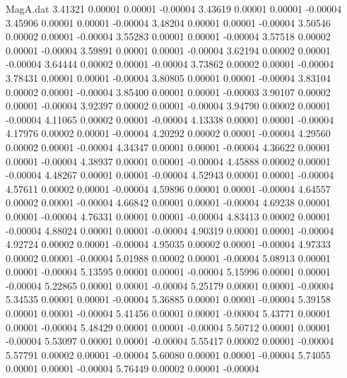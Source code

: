 \begin{filecontents}{MagA.dat}
   3.41321    0.00001    0.00001   -0.00004
   3.43619    0.00001    0.00001   -0.00004
   3.45906    0.00001    0.00001   -0.00004
   3.48204    0.00001    0.00001   -0.00004
   3.50546    0.00002    0.00001   -0.00004
   3.55283    0.00001    0.00001   -0.00004
   3.57518    0.00002    0.00001   -0.00004
   3.59891    0.00001    0.00001   -0.00004
   3.62194    0.00002    0.00001   -0.00004
   3.64444    0.00002    0.00001   -0.00004
   3.73862    0.00002    0.00001   -0.00004
   3.78431    0.00001    0.00001   -0.00004
   3.80805    0.00001    0.00001   -0.00004
   3.83104    0.00002    0.00001   -0.00004
   3.85400    0.00001    0.00001   -0.00003
   3.90107    0.00002    0.00001   -0.00004
   3.92397    0.00002    0.00001   -0.00004
   3.94790    0.00002    0.00001   -0.00004
   4.11065    0.00002    0.00001   -0.00004
   4.13338    0.00001    0.00001   -0.00004
   4.17976    0.00002    0.00001   -0.00004
   4.20292    0.00002    0.00001   -0.00004
   4.29560    0.00002    0.00001   -0.00004
   4.34347    0.00001    0.00001   -0.00004
   4.36622    0.00001    0.00001   -0.00004
   4.38937    0.00001    0.00001   -0.00004
   4.45888    0.00002    0.00001   -0.00004
   4.48267    0.00001    0.00001   -0.00004
   4.52943    0.00001    0.00001   -0.00004
   4.57611    0.00002    0.00001   -0.00004
   4.59896    0.00001    0.00001   -0.00004
   4.64557    0.00002    0.00001   -0.00004
   4.66842    0.00001    0.00001   -0.00004
   4.69238    0.00001    0.00001   -0.00004
   4.76331    0.00001    0.00001   -0.00004
   4.83413    0.00002    0.00001   -0.00004
   4.88024    0.00001    0.00001   -0.00004
   4.90319    0.00001    0.00001   -0.00004
   4.92724    0.00002    0.00001   -0.00004
   4.95035    0.00002    0.00001   -0.00004
   4.97333    0.00002    0.00001   -0.00004
   5.01988    0.00002    0.00001   -0.00004
   5.08913    0.00001    0.00001   -0.00004
   5.13595    0.00001    0.00001   -0.00004
   5.15996    0.00001    0.00001   -0.00004
   5.22865    0.00001    0.00001   -0.00004
   5.25179    0.00001    0.00001   -0.00004
   5.34535    0.00001    0.00001   -0.00004
   5.36885    0.00001    0.00001   -0.00004
   5.39158    0.00001    0.00001   -0.00004
   5.41456    0.00001    0.00001   -0.00004
   5.43771    0.00001    0.00001   -0.00004
   5.48429    0.00001    0.00001   -0.00004
   5.50712    0.00001    0.00001   -0.00004
   5.53097    0.00001    0.00001   -0.00004
   5.55417    0.00002    0.00001   -0.00004
   5.57791    0.00002    0.00001   -0.00004
   5.60080    0.00001    0.00001   -0.00004
   5.74055    0.00001    0.00001   -0.00004
   5.76449    0.00002    0.00001   -0.00004

\end{filecontents}
